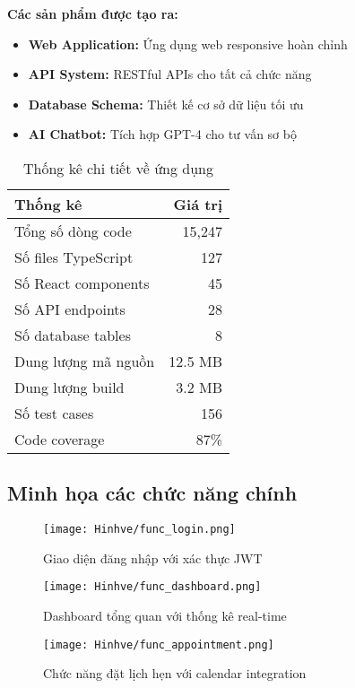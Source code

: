 \documentclass[../DoAn.tex]{subfiles}
\begin{document}
\textbf{Các sản phẩm được tạo ra:}
\begin{itemize}
    \item \textbf{Web Application:} Ứng dụng web responsive hoàn chỉnh
    \item \textbf{API System:} RESTful APIs cho tất cả chức năng
    \item \textbf{Database Schema:} Thiết kế cơ sở dữ liệu tối ưu
    \item \textbf{AI Chatbot:} Tích hợp GPT-4 cho tư vấn sơ bộ
\end{itemize}

\begin{table}[H]
\centering
\begin{tabular}{|l|r|}
\hline
\textbf{Thống kê} & \textbf{Giá trị} \\
\hline
Tổng số dòng code & 15,247 \\
\hline
Số files TypeScript & 127 \\
\hline
Số React components & 45 \\
\hline
Số API endpoints & 28 \\
\hline
Số database tables & 8 \\
\hline
Dung lượng mã nguồn & 12.5 MB \\
\hline
Dung lượng build & 3.2 MB \\
\hline
Số test cases & 156 \\
\hline
Code coverage & 87\% \\
\hline
\end{tabular}
\caption{Thống kê chi tiết về ứng dụng}
\label{table:stats}
\end{table}

\subsection{Minh họa các chức năng chính}

\begin{figure}[H]
    \centering
    \texttt{[image: Hinhve/func\_login.png]}
    \caption{Giao diện đăng nhập với xác thực JWT}
    \label{fig:func_login}
\end{figure}

\begin{figure}[H]
    \centering
    \texttt{[image: Hinhve/func\_dashboard.png]}
    \caption{Dashboard tổng quan với thống kê real-time}
    \label{fig:func_dashboard}
\end{figure}

\begin{figure}[H]
    \centering
    \texttt{[image: Hinhve/func\_appointment.png]}
    \caption{Chức năng đặt lịch hẹn với calendar integration}
    \label{fig:func_appointment}
\end{figure}
\end{document}
